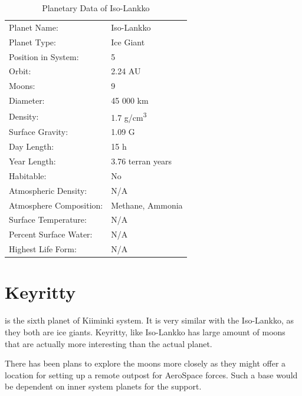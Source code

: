 \documentclass{tufte-book}
\begin{document}
\bigskip
\begin{table}
\begin{minipage}{\textwidth}
\begin{center}
\begin{tabular}{ll}
\toprule
Planet Name: & Iso-Lankko \\
Planet Type: & Ice Giant \\
Position in System: & 5 \\
Orbit: & 2.24 AU \\
Moons: & 9 \\
Diameter: & 45 000 km \\
Density: & 1.7 g/cm\textsuperscript{3} \\
Surface Gravity: & 1.09 G \\
Day Length: & 15 h \\
Year Length: & 3.76 terran years \\
Habitable: & No \\
\quad Atmospheric Density: & N/A \\
\quad Atmosphere Composition: & Methane, Ammonia \\
\quad Surface Temperature: & N/A \\
\quad Percent Surface Water: & N/A \\
\quad Highest Life Form: & N/A \\

\bottomrule
\end{tabular}
\end{center}
\end{minipage}
\caption{Planetary Data of Iso-Lankko}
\end{table}


\section{Keyritty}

 is the sixth planet of Kiiminki system. It is very
similar with the Iso-Lankko, as they both are ice giants. Keyritty, like
Iso-Lankko has large amount of moons that are actually more interesting than
the actual planet.

There has been plans to explore the moons more closely as they might offer a
location for setting up a remote outpost for AeroSpace forces. Such a base
would be dependent on inner system planets for the support.
\end{document}
